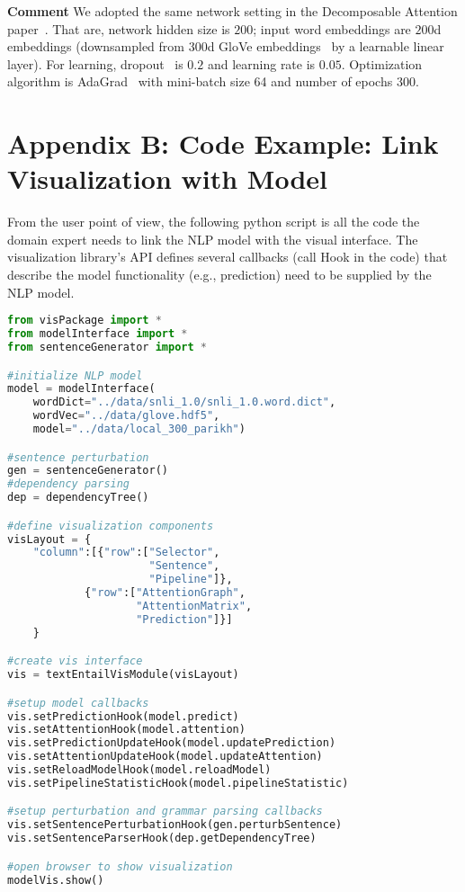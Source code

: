 \documentclass[review,journal]{vgtc}         %
\newcommand{\taoli}[1]{\textcolor{orange}{[#1]}}
\begin{document}

\textbf{Comment} We adopted the same network setting in the Decomposable Attention paper~\cite{parikh2016emnlp}. That are, network hidden size is $200$; input word embeddings are $200$d embeddings (downsampled from $300$d GloVe embeddings~\cite{PenningtonSocherManning2014} by a learnable linear layer). For learning, dropout~\cite{SrivastavaHinton2014} is $0.2$ and learning rate is $0.05$. Optimization algorithm is AdaGrad~\cite{duchi2011adaptive} with mini-batch size 64 and number of epochs 300.

\section{Appendix B: Code Example: Link Visualization with Model}
From the user point of view, the following python script is all the code the domain expert needs to link the NLP model with the visual interface. The visualization library's API defines several callbacks (call Hook in the code) that describe the model functionality (e.g., prediction) need to be supplied by the NLP model.


\begin{lstlisting}[language=Python, caption=Code for generating the visualization.]
from visPackage import *
from modelInterface import *
from sentenceGenerator import *

#initialize NLP model
model = modelInterface(
    wordDict="../data/snli_1.0/snli_1.0.word.dict",
    wordVec="../data/glove.hdf5", 
    model="../data/local_300_parikh")

#sentence perturbation
gen = sentenceGenerator()
#dependency parsing
dep = dependencyTree()

#define visualization components
visLayout = {
    "column":[{"row":["Selector", 
                      "Sentence", 
                      "Pipeline"]},
            {"row":["AttentionGraph", 
                    "AttentionMatrix", 
                    "Prediction"]}]
    }

#create vis interface
vis = textEntailVisModule(visLayout)

#setup model callbacks
vis.setPredictionHook(model.predict)
vis.setAttentionHook(model.attention)
vis.setPredictionUpdateHook(model.updatePrediction)
vis.setAttentionUpdateHook(model.updateAttention)
vis.setReloadModelHook(model.reloadModel)
vis.setPipelineStatisticHook(model.pipelineStatistic)

#setup perturbation and grammar parsing callbacks
vis.setSentencePerturbationHook(gen.perturbSentence)
vis.setSentenceParserHook(dep.getDependencyTree)

#open browser to show visualization
modelVis.show()

\end{lstlisting}

%
%
%


\end{document}
